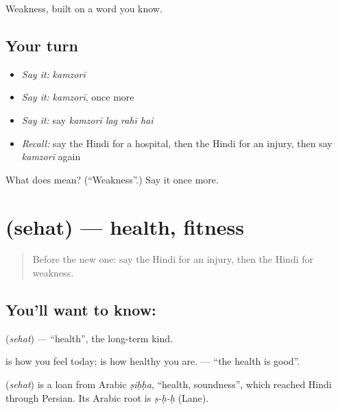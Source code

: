 \begin{grammarlens}[title={What you've built}]
Weakness, built on a word you know.
\end{grammarlens}

\subsection*{Your turn}
\begin{itemize}
\raggedright
  \item \emph{Say it:} \emph{kamzorī}
  \item \emph{Say it:} \emph{kamzorī}, once more
  \item \emph{Say it:} say \emph{kamzorī lag rahī hai}
  \item \emph{Recall:} say the Hindi for a hospital, then the Hindi for an injury, then say \emph{kamzorī} again
\end{itemize}

\begin{tcolorbox}[breakable,colback=teal!4,colframe=teal!35!black,title={Before you move on}]
What does  mean? (\textquotedblleft{}Weakness\textquotedblright{}.) Say it once more.
\end{tcolorbox}
\section[\texorpdfstring{\hi{सेहत} (sehat)}{सेहत (sehat)}]{ (sehat) — health, fitness}

\label{lesson:HI-C107-sehat}



\begin{quote}
Before the new one: say the Hindi for an injury, then the Hindi for weakness.
\end{quote}

\subsection*{You'll want to know: }
\textbf{} (\emph{sehat}) — \textquotedblleft{}health\textquotedblright{}, the long-term kind.

\textbf{} is how you feel today; \textbf{} is how healthy you are. \textbf{  } — \textquotedblleft{}the health is good\textquotedblright{}.

\begin{cousinweb}
\textbf{} (\emph{sehat}) is a loan from Arabic \emph{ṣiḥḥa}, \textquotedblleft{}health, soundness\textquotedblright{}, which reached Hindi through Persian. Its Arabic root is \emph{ṣ-ḥ-ḥ} (Lane).
\end{cousinweb}

